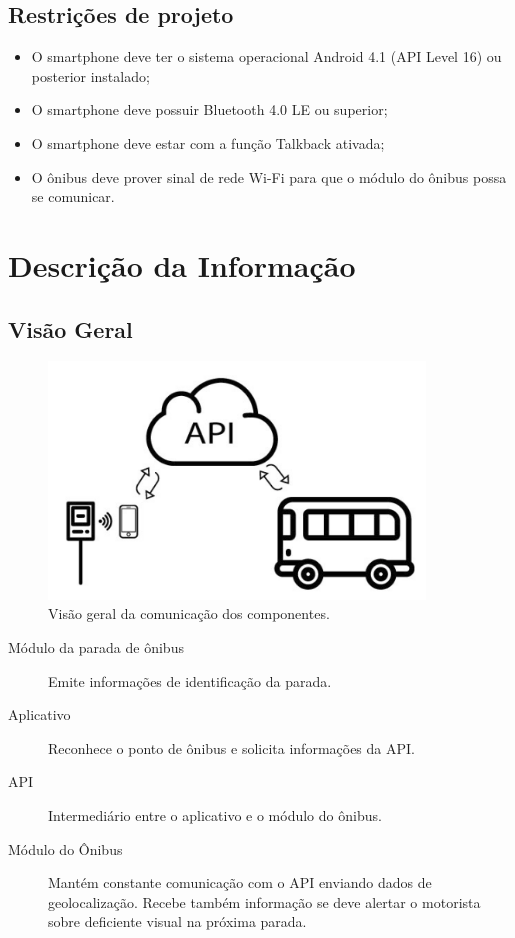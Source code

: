 \documentclass[
	12pt,				%
	oneside,			%
	a4paper,			%
	brazil				%
]{abntex2}
\begin{document}
\section{Restrições de projeto}

\begin{itemize}
\item O smartphone deve ter o sistema operacional Android 4.1 (API Level 16) ou posterior instalado;
\item O smartphone deve possuir Bluetooth 4.0 LE ou superior;
\item O smartphone deve estar com a função Talkback ativada;
\item O ônibus deve prover sinal de rede Wi-Fi para que o módulo do ônibus possa se comunicar.
\end{itemize}

\chapter{Descrição da Informação}

\section{Visão Geral}

\begin{figure}[!h]
\centering
\includegraphics[width=10cm, center]{images/geral-vision-com.png}
\caption{Visão geral da comunicação dos componentes.}
\label{Rotulo}
\end{figure}

\begin{description}
\item[Módulo da parada de ônibus] Emite informações de identificação da parada.

\item[Aplicativo] Reconhece o ponto de ônibus e solicita informações da API.

\item[API] Intermediário entre o aplicativo e o módulo do ônibus.

\item[Módulo do Ônibus] Mantém constante comunicação com o API enviando dados de geolocalização. Recebe também informação se deve alertar o motorista sobre deficiente visual na próxima parada.
\end{description}
\end{document}
